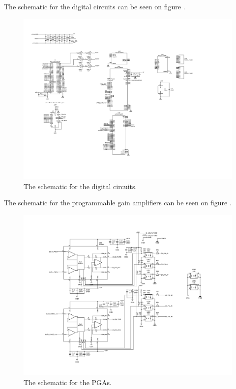 The schematic for the digital circuits can be seen on figure .

\begin{figure}[H]
    \centering
    \includegraphics[clip, trim=0 50 0 0, width=1\textwidth]{Appendix/Figures/A_SCH_DIGITAL.pdf}
    \caption{The schematic for the digital circuits.}
    \label{fig_A_SCH_DIGITAL}
\end{figure}

The schematic for the programmable gain amplifiers can be seen on figure .
\begin{figure}[H]
    \centering
    \includegraphics[clip, trim=0 25 0 0, width=1\textwidth]{Appendix/Figures/A_SCH_PGA.pdf}
    \caption{The schematic for the PGAs.}
    \label{fig_A_SCH_PGA}
\end{figure}

